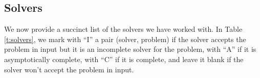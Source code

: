 \subsection{Solvers}\label{subsec:solver}

We now provide a succinct list of the solvers we have worked with. In Table \ref{t:solvers}, we mark with ``I'' a pair (solver, problem) if the solver accepts the problem in input but it is an incomplete solver for the problem, with ``A'' if it is asymptotically complete, with ``C'' if it is complete, and leave it blank if the solver won't accept the problem in input.

